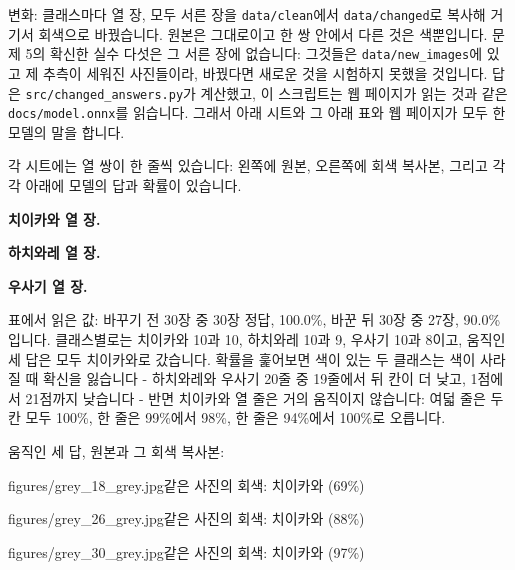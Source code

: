 \documentclass[11pt]{article}
\begin{document}
변화: 클래스마다 열 장, 모두 서른 장을 \texttt{data/clean}에서
\texttt{data/changed}로 복사해 거기서 회색으로 바꿨습니다. 원본은 그대로이고
한 쌍 안에서 다른 것은 색뿐입니다. 문제 5의 확신한 실수 다섯은 그 서른 장에
없습니다: 그것들은 \texttt{data/new\_images}에 있고 제 추측이 세워진
사진들이라, 바꿨다면 새로운 것을 시험하지 못했을 것입니다. 답은
\texttt{src/changed\_answers.py}가 계산했고, 이 스크립트는 웹 페이지가 읽는
것과 같은 \texttt{docs/model.onnx}를 읽습니다. 그래서 아래 시트와 그 아래 표와
웹 페이지가 모두 한 모델의 말을 합니다.

각 시트에는 열 쌍이 한 줄씩 있습니다: 왼쪽에 원본, 오른쪽에 회색 복사본,
그리고 각각 아래에 모델의 답과 확률이 있습니다.

\textbf{치이카와 열 장.}

\textbf{하치와레 열 장.}

\textbf{우사기 열 장.}

표에서 읽은 값: 바꾸기 전 30장 중 30장 정답, 100.0\%, 바꾼 뒤 30장 중 27장,
90.0\%입니다. 클래스별로는 치이카와 10과 10, 하치와레 10과 9, 우사기 10과
8이고, 움직인 세 답은 모두 치이카와로 갔습니다. 확률을 훑어보면 색이 있는 두
클래스는 색이 사라질 때 확신을 잃습니다 - 하치와레와 우사기 20줄 중 19줄에서
뒤 칸이 더 낮고, 1점에서 21점까지 낮습니다 - 반면 치이카와 열 줄은 거의
움직이지 않습니다: 여덟 줄은 두 칸 모두 100\%, 한 줄은 99\%에서 98\%, 한 줄은
94\%에서 100\%로 오릅니다.


움직인 세 답, 원본과 그 회색 복사본:

           {figures/grey_18_grey.jpg}{같은 사진의 회색: 치이카와 (69\%)}

           {figures/grey_26_grey.jpg}{같은 사진의 회색: 치이카와 (88\%)}

           {figures/grey_30_grey.jpg}{같은 사진의 회색: 치이카와 (97\%)}
\end{document}

